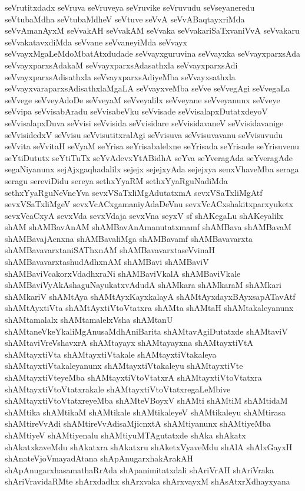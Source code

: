 {seVrutitxdadx
seVruva
seVruveya
seVruvike
seVruvudu
seVseyaneredu
seVtubaMdha
seVtubaMdheV
seVtuve
seVvA
seVvABaqtayxriMda
seVvAmanAyxM
seVvakAH
seVvakAM
seVvaka
seVvakariSaTxvaniVvA
seVvakaru
seVvakatavxdiMda
seVvane
seVvaneyiMda
seVvayx
seVvayxMgaLeMdoMbatAtxdudade
seVvayxguruvina
seVvayxka
seVvayxparxsAda
seVvayxparxsAdakaM
seVvayxparxsAdasathxla
seVvayxparxsAdi
seVvayxparxsAdisathxla
seVvayxparxsAdiyeMba
seVvayxsathxla
seVvayxvaraparxsAdisathxlaMgaLA
seVvayxveMba
seVve
seVvegAgi
seVvegaLa
seVvege
seVveyAdoDe
seVveyaM
seVveyalilx
seVveyane
seVveyanunx
seVveye
seVvipa
seVvisabAradu
seVvisabeVku
seVvisade
seVvisalapxDutatxdeyoV
seVvisalapxDuva
seVvisi
seVvisida
seVvisidare
seVvisidavaneV
seVvisidavanige
seVvisidedxV
seVvisu
seVvisutitxralAgi
seVvisuva
seVvisuvavanu
seVvisuvudu
seVvita
seVvitaH
seVyaM
seYrisa
seYrisabalelxne
seYrisada
seYrisade
seYrisuvenu
seYtiDututx
seYtiTuTx
seYvAdevxYtABidhA
seYva
seYveragAda
seYveragAde
segaNiyanunx
sejAjxgaqhadalilx
sejejx
sejejxyAda
sejejxya
senxVhaveMba
seraga
seragu
sereviDidu
sereya
sethxYyaRM
sethxYyaRguNadiMda
sethxYyaRguNeVneYva
sevxVSaTxliMgAdutatxmA
sevxVSaTxliMgAtf
sevxVSaTxliMgeV
sevxVcACxgamaniyAdaDeVnu
sevxVcACxshakitxparxyuketx
sevxVcaCxyA
sevxVda
sevxVdaja
sevxVna
seyxV
sf
shAKegaLu
shAKeyalilx
shAM
shAMBavAnAM
shAMBavAnAmanutatxmamf
shAMBava
shAMBavaM
shAMBavajAcnxna
shAMBavaliMga
shAMBavamf
shAMBavavarxta
shAMBavavarxtaniSAThxnAM
shAMBavavarxtaseVvinaH
shAMBavavarxtashudAdhxnAM
shAMBavi
shAMBaviV
shAMBaviVcakorxVdadhxraNi
shAMBaviVkalA
shAMBaviVkale
shAMBaviVyAkAshaguNayukatxvAdudA
shAMkara
shAMkaraM
shAMkari
shAMkariV
shAMtAya
shAMtAyxKayxkalayA
shAMtAyxdayxBAyxsapATavAtf
shAMtAyxtiVta
shAMtAyxtiVtoVtatxra
shAMta
shAMtaH
shAMtakaleyanunx
shAMtamalalx
shAMtamalelxVsha
shAMtanU
shAMtaneVkeYkaliMgAnusaMdhAniBarita
shAMtavAgiDutatxde
shAMtaviV
shAMtaviVreVshavxrA
shAMtayayx
shAMtayayxna
shAMtayxtiVtA
shAMtayxtiVta
shAMtayxtiVtakale
shAMtayxtiVtakaleya
shAMtayxtiVtakaleyanunx
shAMtayxtiVtakaleyu
shAMtayxtiVte
shAMtayxtiVteyeMba
shAMtayxtiVtoVtatxrA
shAMtayxtiVtoVtatxra
shAMtayxtiVtoVtatxrakale
shAMtayxtiVtoVtatxregaLeMbive
shAMtayxtiVtoVtatxreyeMba
shAMteVBoyxV
shAMti
shAMtiM
shAMtidaM
shAMtika
shAMtikaM
shAMtikale
shAMtikaleyeV
shAMtikaleyu
shAMtirasa
shAMtireVvAdi
shAMtireVvAdisaMjicnxtA
shAMtiyanunx
shAMtiyeMba
shAMtiyeV
shAMtiyenalu
shAMtiyuMTAgutatxde
shAka
shAkatx
shAkatxkaveMdu
shAkatxra
shAkatxru
shAketxVyaveMdu
shAlA
shAlxGayxH
shAnateVjoVmayadAtana
shApAnugarxhakArakAH
shApAnugarxhasamathaRrAda
shApanimitatxdali
shAriVrAH
shAriVraka
shAriVravidaRMte
shArxdadhx
shArxvaka
shArxvayxM
shAsAtxrXdhayxyana
}
